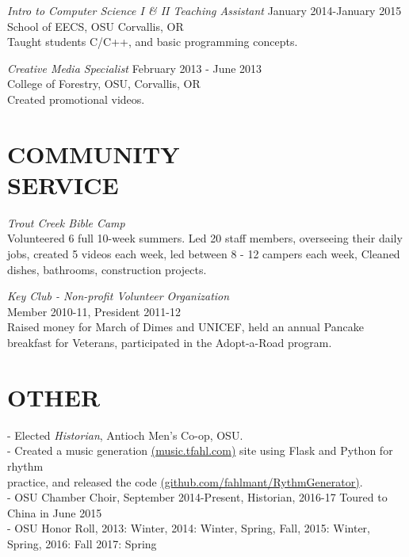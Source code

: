 \documentclass[line,margin]{res}
\begin{document}
\begin{resume}
                    {\sl Intro to Computer Science I \& II Teaching Assistant} \hfill January 2014-January 2015\\
                    School of EECS, OSU
                    Corvallis, OR\\
                    Taught students C/C++, and basic programming concepts.
                    
                    {\sl Creative Media Specialist} \hfill February 2013 - June 2013 \\
                    College of Forestry, OSU,
                    Corvallis, OR\\
                    Created promotional videos.
 
\section{COMMUNITY \\ SERVICE}  
                {\sl Trout Creek Bible Camp\\}
                    Volunteered 6 full 10-week summers.
                    Led 20 staff members, overseeing their daily jobs,
                    created 5 videos each week,
                    led between 8 - 12 campers each week,
                    Cleaned dishes, bathrooms, construction projects.

                {\sl Key Club - Non-profit Volunteer Organization\\}
                    Member 2010-11, President 2011-12\\
                    Raised money for March of Dimes and UNICEF, held an annual Pancake breakfast
                    for Veterans, participated in the Adopt-a-Road program.

\section{OTHER\\}             
                - Elected {\it Historian}, Antioch Men's Co-op, OSU. \\
                - Created a music generation \href{http://music.tfahl.com}{(music.tfahl.com)} 
                      site using Flask and Python for rhythm\\ 
                      practice, and released the code 
                      \href{https://github.com/fahlmant/RhythmGenerator}{(github.com/fahlmant/RythmGenerator)}.\\
                - OSU Chamber Choir, September 2014-Present, Historian, 2016-17 Toured to China in June 2015\\
                - OSU Honor Roll, 2013: Winter, 2014: Winter, Spring, Fall, 2015: Winter, Spring, 2016: Fall 2017: Spring\\

\end{resume}
\end{document}
